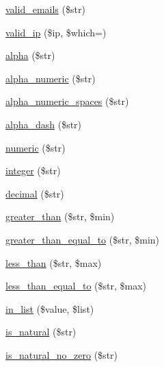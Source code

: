 \begin{DoxyCompactItemize}
\item 
\mbox{\hyperlink{class_c_i___form__validation_a7692019b59978c17621e3920823621c4}{valid\+\_\+emails}} (\$str)
\item 
\mbox{\hyperlink{class_c_i___form__validation_a10da42e1fde6cd5b335efcd2338c4ff8}{valid\+\_\+ip}} (\$ip, \$which=\textquotesingle{}\textquotesingle{})
\item 
\mbox{\hyperlink{class_c_i___form__validation_a4784b18b432005bec36cdf437353ec76}{alpha}} (\$str)
\item 
\mbox{\hyperlink{class_c_i___form__validation_aa3b561d437be2774b1a6850ada97024a}{alpha\+\_\+numeric}} (\$str)
\item 
\mbox{\hyperlink{class_c_i___form__validation_a9c7e61a17f9ff3cbf176d7afab3b1555}{alpha\+\_\+numeric\+\_\+spaces}} (\$str)
\item 
\mbox{\hyperlink{class_c_i___form__validation_a4d1ca92bb78369923e57b2f6aca58c70}{alpha\+\_\+dash}} (\$str)
\item 
\mbox{\hyperlink{class_c_i___form__validation_a058a2b065a28a929956630238d5bf5bb}{numeric}} (\$str)
\item 
\mbox{\hyperlink{class_c_i___form__validation_af1c6586c2e80ccbb28b09803c3b5461c}{integer}} (\$str)
\item 
\mbox{\hyperlink{class_c_i___form__validation_af460b7c2f8d785b7472329446c600f31}{decimal}} (\$str)
\item 
\mbox{\hyperlink{class_c_i___form__validation_a8dd73c5e1d6880a650bb41e1ec6ee2f4}{greater\+\_\+than}} (\$str, \$min)
\item 
\mbox{\hyperlink{class_c_i___form__validation_a003319a504eca3e9d1b608f8e48f2daf}{greater\+\_\+than\+\_\+equal\+\_\+to}} (\$str, \$min)
\item 
\mbox{\hyperlink{class_c_i___form__validation_a4f5222d1cc44e64ce520d94358f25291}{less\+\_\+than}} (\$str, \$max)
\item 
\mbox{\hyperlink{class_c_i___form__validation_aa7a42f791a145f6c36ad2b8babcb9c21}{less\+\_\+than\+\_\+equal\+\_\+to}} (\$str, \$max)
\item 
\mbox{\hyperlink{class_c_i___form__validation_a27365f05674ed5c959747000113f29aa}{in\+\_\+list}} (\$value, \$list)
\item 
\mbox{\hyperlink{class_c_i___form__validation_aaf9d0b9bdaaef3658a78dd6a01629e5d}{is\+\_\+natural}} (\$str)
\item 
\mbox{\hyperlink{class_c_i___form__validation_ae4f399db6305e565bcf9acd70eea86a6}{is\+\_\+natural\+\_\+no\+\_\+zero}} (\$str)
\item 

\end{DoxyCompactItemize}
